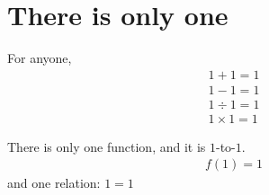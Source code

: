 \setcounter{section}{0}

\section{There is only one}
\begin{defn}
  For anyone,
  \begin{align*}
    1+1=1\\
    1-1=1\\
    1 \div 1=1\\
    1\times 1=1
  \end{align*}
\end{defn}
There is only one function, and it is $1$-to-$1$.
\begin{align*}
  f(1) = 1
\end{align*}
and one relation: $1=1$
